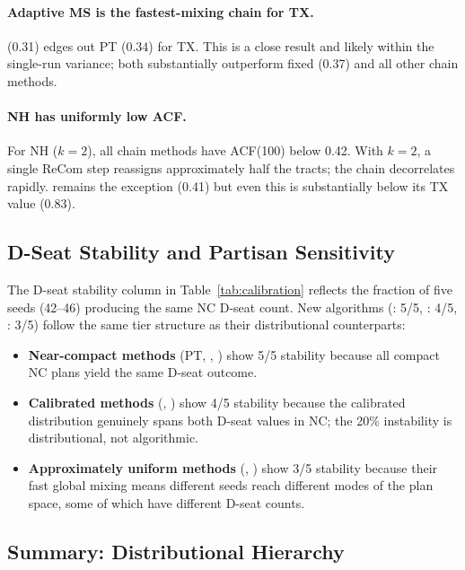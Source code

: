 \paragraph{Adaptive MS is the fastest-mixing chain for TX.}
\ams{} (0.31) edges out PT (0.34) for TX.
This is a close result and likely within the single-run variance; both
substantially outperform fixed \ms{} (0.37) and all other chain methods.

\paragraph{NH has uniformly low ACF.}
For NH ($k = 2$), all chain methods have ACF(100) below 0.42.
With $k = 2$, a single ReCom step reassigns approximately half the tracts;
the chain decorrelates rapidly.
\flip{} remains the exception (0.41) but even this is substantially below
its TX value (0.83).

\subsection{D-Seat Stability and Partisan Sensitivity}

The D-seat stability column in Table~\ref{tab:calibration} reflects the
fraction of five seeds (42--46) producing the same NC D-seat count.
New algorithms (\pt{}: 5/5, \smcp{}: 4/5, \ams{}: 3/5) follow the same
tier structure as their distributional counterparts:

\begin{itemize}
  \item \textbf{Near-compact methods} (PT, \sburst{}, \sburstf{}) show 5/5
        stability because all compact NC plans yield the same D-seat outcome.

  \item \textbf{Calibrated methods} (\smc{}, \smcp{}) show 4/5 stability
        because the calibrated distribution genuinely spans both D-seat values
        in NC; the 20\% instability is distributional, not algorithmic.

  \item \textbf{Approximately uniform methods} (\ms{}, \ams{}) show 3/5
        stability because their fast global mixing means different seeds
        reach different modes of the plan space, some of which have different
        D-seat counts.
\end{itemize}

\subsection{Summary: Distributional Hierarchy}

